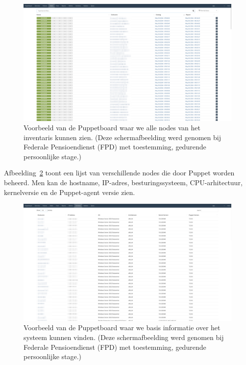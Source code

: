 \begin{figure}[h!]
    \includegraphics[width=\textwidth]
    {./graphics/state-of-the-art/puppetboard/puppetboard-hosts.png}
    \caption[Puppetboard inventaris van nodes.]{\label{fig:puppetboard-inventory}Voorbeeld van de Puppetboard waar we alle nodes van het inventaris kunnen zien. (Deze schermafbeelding werd genomen bij Federale Pensioendienst (FPD) met toestemming, gedurende persoonlijke stage.)}
\end{figure}

Afbeelding~\ref{fig:puppetboard-example-4} toont een lijst van verschillende nodes die door Puppet worden beheerd.
Men kan de hostname, IP-adres, besturingssysteem, CPU-arhitectuur, kernelversie en de Puppet-agent versie zien.

\begin{figure}[h!]
    \includegraphics[width=\textwidth]
    {./graphics/state-of-the-art/puppetboard/puppetboard-inventory.png}
    \caption[Basisinformatie op Puppetboard.]{\label{fig:puppetboard-example-4}Voorbeeld van de Puppetboard waar we basis informatie over het systeem kunnen vinden. (Deze schermafbeelding werd genomen bij Federale Pensioendienst (FPD) met toestemming, gedurende persoonlijke stage.)}
\end{figure}
